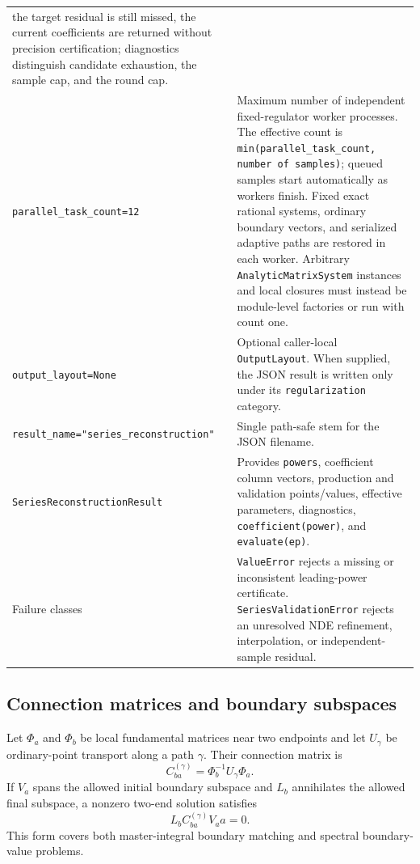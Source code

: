 \documentclass[11pt]{article}
\begin{document}
\begin{longtable}{L{0.36\textwidth}L{0.58\textwidth}}
the target residual is still missed, the current coefficients are returned without precision
certification; diagnostics distinguish candidate exhaustion, the sample cap, and the round cap. \\
\texttt{parallel\_task\_count=12} & Maximum number of independent fixed-regulator worker
processes.  The effective count is \texttt{min(parallel\_task\_count, number of samples)};
queued samples start automatically as workers finish.  Fixed exact rational systems, ordinary
boundary vectors, and serialized adaptive paths are restored in each worker.  Arbitrary
\texttt{AnalyticMatrixSystem} instances and local closures must instead be module-level
factories or run with count one. \\
\texttt{output\_layout=None} & Optional caller-local \texttt{OutputLayout}.  When supplied,
the JSON result is written only under its \texttt{regularization} category. \\
\texttt{result\_name=}\newline\texttt{"series\_reconstruction"} & Single path-safe stem for
the JSON filename. \\
\texttt{SeriesReconstructionResult} & Provides \texttt{powers}, coefficient column vectors,
production and validation points/values, effective parameters, diagnostics,
\texttt{coefficient(power)}, and \texttt{evaluate(ep)}. \\
Failure classes & \texttt{ValueError} rejects a missing or inconsistent leading-power
certificate. \texttt{SeriesValidationError} rejects an unresolved NDE refinement,
interpolation, or independent-sample residual. \\
\bottomrule
\end{longtable}
\normalsize

\subsection{Connection matrices and boundary subspaces}

Let $\Phi_a$ and $\Phi_b$ be local fundamental matrices near two endpoints and let
$U_\gamma$ be ordinary-point transport along a path $\gamma$.  Their connection matrix is
\begin{equation}
  C_{ba}^{(\gamma)}=\Phi_b^{-1}U_\gamma\Phi_a.
\end{equation}
If $V_a$ spans the allowed initial boundary subspace and $L_b$ annihilates the allowed final
subspace, a nonzero two-end solution satisfies
\begin{equation}
  L_b C_{ba}^{(\gamma)}V_a a=0.
  \label{eq:two-end-condition}
\end{equation}
This form covers both master-integral boundary matching and spectral boundary-value
problems.
\end{document}
